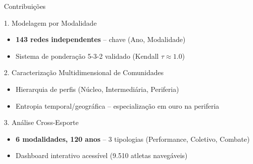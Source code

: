 \begin{frame}{Contribuições}
    \begin{block}{1. Modelagem por Modalidade}
        \footnotesize
        \begin{itemize}
            \item \textbf{143 redes independentes} -- chave (Ano, Modalidade)
            \item Sistema de ponderação 5-3-2 validado (Kendall $\tau \approx 1.0$)
        \end{itemize}
    \end{block}

    \vspace{0.1cm}

    \begin{block}{2. Caracterização Multidimensional de Comunidades}
        \footnotesize
        \begin{itemize}
            \item Hierarquia de perfis (Núcleo, Intermediária, Periferia)
            \item Entropia temporal/geográfica -- especialização em ouro na periferia
        \end{itemize}
    \end{block}

    \vspace{0.1cm}

    \begin{block}{3. Análise Cross-Esporte}
        \footnotesize
        \begin{itemize}
            \item \textbf{6 modalidades, 120 anos} -- 3 tipologias (Performance, Coletivo, Combate)
            \item Dashboard interativo acessível (9.510 atletas navegáveis)
        \end{itemize}
    \end{block}
\end{frame}

